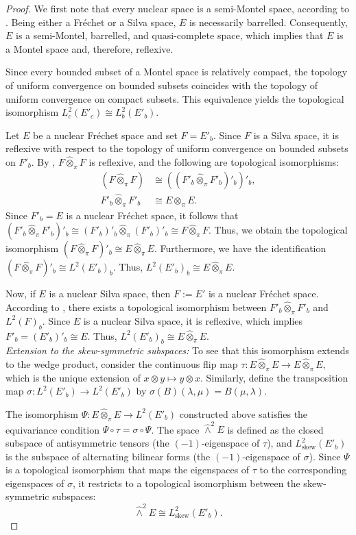 \documentclass[11pt,reqno]{amsart}
\theoremstyle{definition}
\numberwithin{equation}{section}
\begin{document}
\begin{proof}
We first note that every nuclear space is a semi-Montel space, according to \cite[Propositions 50.2, 50.12]{31}. Being either a Fréchet or a Silva space, $E$ is necessarily barrelled. Consequently, $E$ is a semi-Montel, barrelled, and quasi-complete space, which implies that $E$ is a Montel space and, therefore, reflexive.

Since every bounded subset of a Montel space is relatively compact, the topology of uniform convergence on bounded subsets coincides with the topology of uniform convergence on compact subsets. This equivalence yields the topological isomorphism $L^2_c(E'_c) \cong L^2_b(E'_b)$. 

Let $E$ be a nuclear Fréchet space and set $F = E'_b$. Since $F$ is a Silva space, it is reflexive with respect to the topology of uniform convergence on bounded subsets on $F'_b$. By \cite[9.9 Corollary 1]{28}, $F \hat{\otimes}_{\pi} F$ is reflexive, and the following are topological isomorphisms:
\begin{align*}
(F \hat{\otimes}_{\pi} F) &\cong ((F'_b \hat{\otimes}_{\pi} F'_b)'_b)'_b, \\
F'_b \hat{\otimes}_{\pi} F'_b &\cong E \hat{\otimes}_{\pi} E.
\end{align*}
Since $F'_b = E$ is a nuclear Fréchet space, it follows that $(F'_b \hat{\otimes}_{\pi} F'_b)'_b \cong (F'_b)'_b \hat{\otimes}_{\pi} (F'_b)'_b \cong F \hat{\otimes}_{\pi} F$. Thus, we obtain the topological isomorphism $(F \hat{\otimes}_{\pi} F)'_b \cong E \hat{\otimes}_{\pi} E$. Furthermore, we have the identification $(F \hat{\otimes}_{\pi} F)'_b \cong L^2(E'_b)_b$. Thus, $L^2(E'_b)_b\cong E \hat{\otimes}_{\pi} E.$


Now, if $E$ is a nuclear Silva space, then $F := E'$ is a nuclear Fréchet space. According to \cite[Theorem 9.9]{28}, there exists a topological isomorphism between $F'_b \hat{\otimes}_{\pi} F'_b$ and $L^2(F)_b$. Since $E$ is a nuclear Silva space, it is reflexive, which implies $F'_b = (E'_b)'_b \cong E$. Thus, $L^2(E'_b)_b\cong E \hat{\otimes}_{\pi} E$. \\
\textit{Extension to the skew-symmetric subspaces:}
To see that this isomorphism extends to the wedge product, consider the continuous flip map $\tau: E \hat{\otimes}_{\pi} E \to E \hat{\otimes}_{\pi} E$, which is the unique extension of $x \otimes y \mapsto y \otimes x$. Similarly, define the transposition map $\sigma: L^2(E'_b) \to L^2(E'_b)$ by $\sigma(B)(\lambda, \mu) = B(\mu, \lambda)$.

The isomorphism $\Psi: E \hat{\otimes}_{\pi} E \to L^2(E'_b)$ constructed above satisfies the equivariance condition $\Psi \circ \tau = \sigma \circ \Psi$. The space $\hat\wedge^2 E$ is defined as the closed subspace of antisymmetric tensors (the $(-1)$-eigenspace of $\tau$), and $L^2_{\text{skew}}(E'_b)$ is the subspace of alternating bilinear forms (the $(-1)$-eigenspace of $\sigma$). Since $\Psi$ is a topological isomorphism that maps the eigenspaces of $\tau$ to the corresponding eigenspaces of $\sigma$, it restricts to a topological isomorphism between the skew-symmetric subspaces:
\[
\hat\wedge^2 E \cong L^2_{\text{skew}}(E'_b).
\]
\end{proof}
\end{document}

